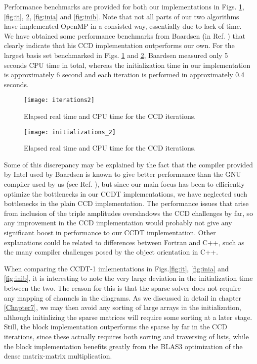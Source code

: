 Performance benchmarks are provided for both our implementations in
Figs. \ref{fig:it2}, \ref{fig:it}, \ref{fig:ini2}, \ref{fig:inia} and
\ref{fig:inib}. Note that not all parts of our two algorithms have implemented OpenMP
\cite{openmp} in a consisted way, essentially due to lack of time. We
have obtained some performance benchmarks from Baardsen (in
Ref. \cite{Baardsen2015}) that clearly indicate that his CCD
implementation outperforms our own. For the largest basis set
benchmarked in Figs. \ref{fig:it2} and \ref{fig:ini2}, Baardsen
measured only 5 seconds CPU time in total, whereas the initialization
time in our implementation is approximately 6 second and each
iteration is performed in approximately 0.4 seconds.

\begin{figure}[!htb]
  \centering
  \texttt{[image: iterations2]}
  \caption{Elapsed real time and CPU time for the CCD iterations.}
\label{fig:it2}
\end{figure}

\begin{figure}[!htb]
  \centering
  \texttt{[image: initializations\_2]}
  \caption{Elapsed real time and CPU time for the CCD iterations.}
\label{fig:ini2}
\end{figure}

Some of this discrepancy may be explained by the fact that the
compiler provided by Intel used by Baardsen is known to give better
performance than the GNU compiler used by us (see
Ref. \cite{abel_drift}), but since our main focus has been to
efficiently optimize the bottlenecks in our CCDT implementations, we
have neglected such bottlenecks in the plain CCD implementation. The
performance issues that arise from inclusion of the triple amplitudes
overshadows the CCD challenges by far, so any improvement in the CCD
implementation would probably not give any significant boost in performance to our
CCDT implementation. Other explanations could be related to differences between
Fortran and C++, such as the many compiler challenges posed by the
object orientation in C++.

When comparing the CCDT-1 imlementations in Figs.\ref{fig:it},
\ref{fig:inia} and \ref{fig:inib}, it is interesting to note the very
large deviation in the initialization time between the two. The reason
for this is that the sparse solver does not require any mapping of
channels in the diagrams. As we discussed in detail in chapter
\ref{Chapter7}, we may then avoid any sorting of large arrays in the
initialization, although initializing the sparse matrices will require
some sorting at a later stage. Still, the block implementation
outperforms the sparse by far in the CCD iterations, since these
actually requires both sorting and traversing of lists, while the
block implementation benefits greatly from the BLAS3 optimization of
the dense matrix-matrix multiplication.


